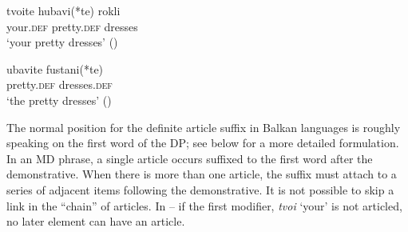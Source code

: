 \documentclass[output=paper,
colorlinks,
citecolor=brown,
newtxmath
]{langscibook}
\begin{document}

\ea \label{dresses3}
\ea \label{dresses3b}
\gll tvoite 	hubavi(*te) 	rokli\\
 	your.\textsc{def}	pretty.\textsc{def}	dresses \\
\glt ‘your pretty dresses’ \hfill()

\ex \label{dresses3m}
\gll ubavite	fustani(*te) \\
pretty.\textsc{def} 	dresses.\textsc{def} \\
\glt ‘the pretty dresses’ \hfill()
\z
\z

\noindent The normal position for the definite article suffix in Balkan  languages is roughly speaking on the first word of the DP; see below for a more detailed formulation. In an MD phrase, a single article occurs suffixed to the first word after the demonstrative. When there is more than one article, the suffix must attach to a series of adjacent items following the demonstrative. It is not possible to skip a link in the ``chain'' of articles. In -- if the first modifier, \textit{tvoi} `your' is not articled, no later element can have an article.


\ea \label{yourphoneb}
\z
\z

\end{document}
